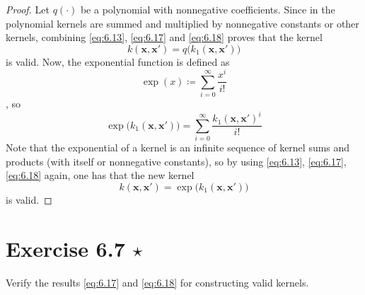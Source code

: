 \begin{proof}
    Let $q(\cdot)$ be a polynomial with nonnegative coefficients. Since in the polynomial
    kernels are summed and multiplied by nonnegative constants or other kernels, combining
    \eqref{eq:6.13}, \eqref{eq:6.17} and \eqref{eq:6.18} proves that
    the kernel
    \begin{equation*}
        k(\mathbf{x}, \mathbf{x}') = q\big(k_1(\mathbf{x}, \mathbf{x}')\big)
        \tag{6.15}\label{eq:6.15}
    \end{equation*}
    is valid. Now, the exponential function is defined as
    \[
        \exp(x) \coloneqq \sum_{i=0}^{\infty} \frac{x^i}{i!} 
    \],
    so
    \[
        \exp\big(k_1(\mathbf{x}, \mathbf{x}')\big)
        = \sum_{i=0}^{\infty} \frac{k_1(\mathbf{x}, \mathbf{x}')^i}{i!}
    \] 
    Note that the exponential of a kernel is an infinite sequence of kernel sums
    and products (with itself or nonnegative constants), so by using
    \eqref{eq:6.13}, \eqref{eq:6.17}, \eqref{eq:6.18} again, one has that
    the new kernel
    \begin{equation*}
        k(\mathbf{x}, \mathbf{x}') = \exp\big(k_1(\mathbf{x}, \mathbf{x}')\big)
        \tag{6.16}\label{eq:6.16}
    \end{equation*}
    is valid.
\end{proof}

\section*{Exercise 6.7 $\star$}
Verify the results \eqref{eq:6.17} and \eqref{eq:6.18} for constructing valid kernels.

\vspace{1em}


